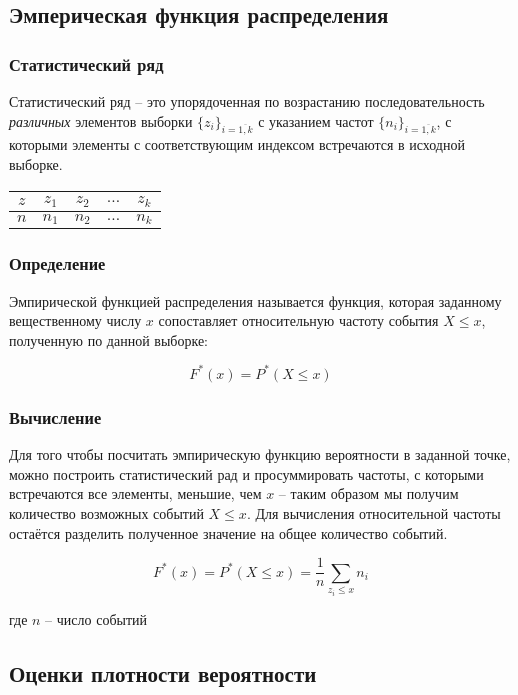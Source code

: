 \subsection{Эмперическая функция распределения}
\subsubsection{Статистический ряд}	Статистический ряд -- это упорядоченная по возрастанию последовательность \textit{различных} элементов выборки $\{z_i\}_{i = \overline{1,k}}$ с  указанием частот $\{n_i\}_{i = \overline{1,k}}$, с которыми элементы с соответствующим индексом встречаются в исходной выборке.

\begin{tabular}{|c|c|c|c|c|}
	\hline
	$z$ & $z_1$ & $z_2$ & $\ldots$ & $z_k$ \\
	\hline
	$n$ & $n_1$ & $n_2$ & $\ldots$ & $n_k$ \\
	\hline
\end{tabular}

\subsubsection{Определение}
Эмпирической функцией распределения называется функция, которая заданному вещественному числу $x$ сопоставляет относительную частоту события $X \leq x$, полученную по данной выборке:

\begin{equation}\label{edf}
F^*(x)=P^*(X \leq x)
\end{equation}

\subsubsection{Вычисление}
Для того чтобы посчитать эмпирическую функцию вероятности в заданной точке, можно построить статистический рад и просуммировать частоты, с которыми встречаются все элементы, меньшие, чем $x$  -- таким образом мы получим количество возможных событий $X \leq x $. Для вычисления относительной частоты остаётся разделить полученное значение на общее количество событий.

\begin{equation}\label{edf}
F^*(x)=P^*(X \leq x) = \displaystyle \frac{1}{n}\sum_{z_i \leq x}{n_i}
\end{equation}

где $n$ -- число событий

\subsection{Оценки плотности вероятности}
